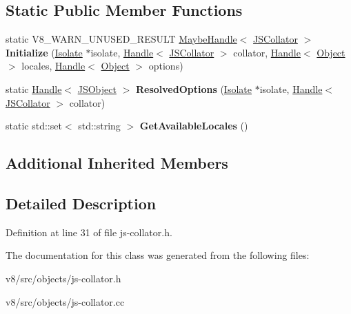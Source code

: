 \subsection*{Static Public Member Functions}
\begin{DoxyCompactItemize}
\item 
\mbox{\label{classv8_1_1internal_1_1JSCollator_a8535460fdc111358d1f832eb5a8115a8}} 
static V8\+\_\+\+W\+A\+R\+N\+\_\+\+U\+N\+U\+S\+E\+D\+\_\+\+R\+E\+S\+U\+LT \mbox{\hyperlink{classv8_1_1internal_1_1MaybeHandle}{Maybe\+Handle}}$<$ \mbox{\hyperlink{classv8_1_1internal_1_1JSCollator}{J\+S\+Collator}} $>$ {\bfseries Initialize} (\mbox{\hyperlink{classv8_1_1internal_1_1Isolate}{Isolate}} $\ast$isolate, \mbox{\hyperlink{classv8_1_1internal_1_1Handle}{Handle}}$<$ \mbox{\hyperlink{classv8_1_1internal_1_1JSCollator}{J\+S\+Collator}} $>$ collator, \mbox{\hyperlink{classv8_1_1internal_1_1Handle}{Handle}}$<$ \mbox{\hyperlink{classv8_1_1internal_1_1Object}{Object}} $>$ locales, \mbox{\hyperlink{classv8_1_1internal_1_1Handle}{Handle}}$<$ \mbox{\hyperlink{classv8_1_1internal_1_1Object}{Object}} $>$ options)
\item 
\mbox{\label{classv8_1_1internal_1_1JSCollator_a0f73288eae442b6d21041ab1ce2e71f7}} 
static \mbox{\hyperlink{classv8_1_1internal_1_1Handle}{Handle}}$<$ \mbox{\hyperlink{classv8_1_1internal_1_1JSObject}{J\+S\+Object}} $>$ {\bfseries Resolved\+Options} (\mbox{\hyperlink{classv8_1_1internal_1_1Isolate}{Isolate}} $\ast$isolate, \mbox{\hyperlink{classv8_1_1internal_1_1Handle}{Handle}}$<$ \mbox{\hyperlink{classv8_1_1internal_1_1JSCollator}{J\+S\+Collator}} $>$ collator)
\item 
\mbox{\label{classv8_1_1internal_1_1JSCollator_ac21253c98f27b038730c99125135ae82}} 
static std\+::set$<$ std\+::string $>$ {\bfseries Get\+Available\+Locales} ()
\end{DoxyCompactItemize}
\subsection*{Additional Inherited Members}


\subsection{Detailed Description}


Definition at line 31 of file js-\/collator.\+h.



The documentation for this class was generated from the following files\+:\begin{DoxyCompactItemize}
\item 
v8/src/objects/js-\/collator.\+h\item 
v8/src/objects/js-\/collator.\+cc\end{DoxyCompactItemize}
